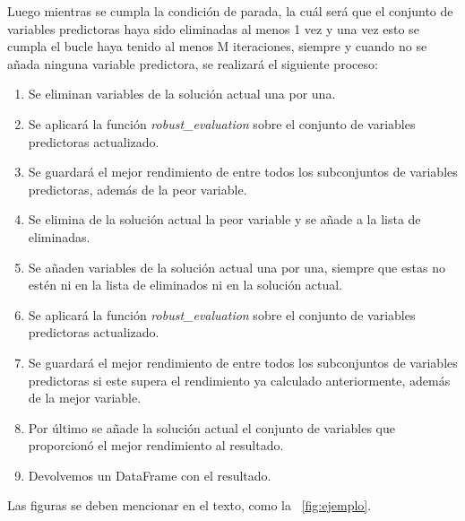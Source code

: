 \documentclass[conference,a4paper]{IEEEtran}
\begin{document}
  Luego mientras se cumpla la condición de parada, la cuál será que el conjunto de variables predictoras haya sido 
  eliminadas al menos 1 vez y una vez esto se cumpla el bucle haya tenido al menos M iteraciones, siempre y cuando 
  no se añada ninguna variable predictora, se realizará el siguiente proceso:
  \begin{enumerate}
    \item Se eliminan variables de la solución actual una por una.
    \item Se aplicará la función \emph{robust\_evaluation} sobre el conjunto de variables predictoras actualizado.
    \item Se guardará el mejor rendimiento de entre todos los subconjuntos de variables predictoras, además de la peor variable.
    \item Se elimina de la solución actual la peor variable y se añade a la lista de eliminadas.
    \item Se añaden variables de la solución actual una por una, siempre que estas no estén ni en la lista de eliminados ni en la solución actual.
    \item Se aplicará la función \emph{robust\_evaluation} sobre el conjunto de variables predictoras actualizado.
    \item Se guardará el mejor rendimiento de entre todos los subconjuntos de variables predictoras si este supera el rendimiento ya calculado anteriormente, además de la mejor variable.
    \item Por último se añade la solución actual el conjunto de variables que proporcionó el mejor rendimiento al resultado.
    \item Devolvemos un DataFrame con el resultado.
  \end{enumerate}

Las figuras se deben mencionar en el texto, como la
\figurename~\ref{fig:ejemplo}.
\end{document}
